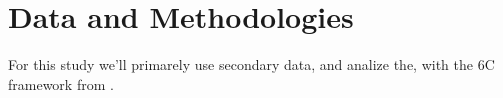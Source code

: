 \section{Data and Methodologies}
For this study we'll primarely use secondary data, and analize the,
with the 6C framework from \cite{RONG201541}.
